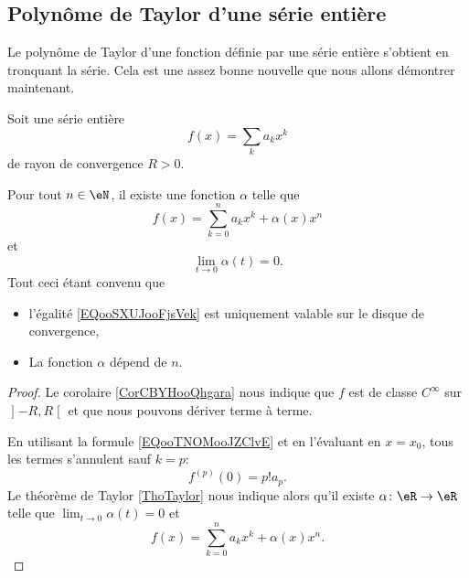\subsection{Polynôme de Taylor d'une série entière}

Le polynôme de Taylor d'une fonction définie par une série entière s'obtient en tronquant la série. Cela est une assez bonne nouvelle que nous allons démontrer maintenant.

\begin{proposition}      \label{PROPooQLHNooRsBYbe}
	Soit une série entière
	\begin{equation}
		f(x)=\sum_ka_kx^k
	\end{equation}
	de rayon de convergence \( R>0\).

	Pour tout \( n\in \eN\), il existe une fonction \( \alpha\) telle que
	\begin{equation}    \label{EQooSXUJooFjsVek}
		f(x)=\sum_{k=0}^na_kx^k+\alpha(x)x^n
	\end{equation}
	et
	\begin{equation}
		\lim_{t\to 0} \alpha(t)=0.
	\end{equation}
	Tout ceci étant convenu que
	\begin{itemize}
		\item
		      l'égalité \eqref{EQooSXUJooFjsVek} est uniquement valable sur le disque de convergence,
		\item La fonction \( \alpha\) dépend de \( n\).
	\end{itemize}
\end{proposition}

\begin{proof}
	Le corolaire \ref{CorCBYHooQhgara} nous indique que \( f\) est de classe \(  C^{\infty}\) sur \( \mathopen] -R , R \mathclose[\) et que nous pouvons dériver terme à terme.

	En utilisant la formule \eqref{EQooTNOMooJZClvE} et en l'évaluant en \( x=x_0\), tous les termes s'annulent sauf \( k=p\):
	\begin{equation}
		f^{(p)}(0)=p!a_p.
	\end{equation}
	Le théorème de Taylor \ref{ThoTaylor} nous indique alors qu'il existe \( \alpha\colon \eR\to \eR\) telle que \( \lim_{t\to 0} \alpha(t)=0\) et
	\begin{equation}
		f(x)=\sum_{k=0}^{n}a_kx^k+\alpha(x)x^n.
	\end{equation}
\end{proof}

